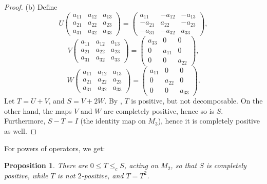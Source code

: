 \documentclass[12pt]{amsart}
\theoremstyle{plain}
\newtheorem{proposition}[theorem]{Proposition}
\theoremstyle{definition}
\renewcommand{\leq}{\leqslant}
\begin{document}
\begin{proof}
(b) Define %
$$
U \begin{pmatrix}
   a_{11}  &  a_{12}  &  a_{13}  \\
   a_{21}  &  a_{22}  &  a_{23}  \\
   a_{31}  &  a_{32}  &  a_{33}
\end{pmatrix} =
\begin{pmatrix}
   a_{11}    &  - a_{12}  &  - a_{13}  \\
   - a_{21}  &  a_{22}    &  - a_{23}  \\
   - a_{31}  &  - a_{32}  &  a_{33}
\end{pmatrix} ,
$$
$$
V \begin{pmatrix}
   a_{11}  &  a_{12}  &  a_{13}  \\
   a_{21}  &  a_{22}  &  a_{23}  \\
   a_{31}  &  a_{32}  &  a_{33}
\end{pmatrix} =
\begin{pmatrix}
   a_{33}  &  0         &  0            \\
   0         &  a_{11}  &  0            \\
   0         &  0          &  a_{22}
\end{pmatrix} ,
$$
$$
W \begin{pmatrix}
   a_{11}  &  a_{12}  &  a_{13}  \\
   a_{21}  &  a_{22}  &  a_{23}  \\
   a_{31}  &  a_{32}  &  a_{33}
\end{pmatrix} =
\begin{pmatrix}
   a_{11}   &  0         &  0            \\
   0        &  a_{22}    &  0            \\
   0        &  0         &  a_{33}
\end{pmatrix} .
$$
Let $T = U + V$, and $S = V + 2W$.
By \cite{St82}, $T$ is positive, but not decomposable. On the other hand,
the maps $V$ and $W$ are completely positive, hence so is $S$. Furthermore,
$S - T = I$ (the identity map on $M_3$), hence it is completely positive as well.
\end{proof}

For powers of operators, we get:

\begin{proposition}\label{prop:nogo powers}
There are $0 \leq T \leq_c S$, acting on $M_2$, so that $S$ is completely positive,
while $T$ is not $2$-positive, and $T = T^2$.
\end{proposition}
\end{document}

